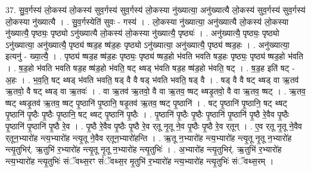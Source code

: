\documentclass[17pt]{extarticle}
\begin{document}
37. सु॒व॒र्गस्य॑ लो॒कस्य॑ लो॒कस्य॑ सुव॒र्गस्य॑ सुव॒र्गस्य॑ लो॒कस्या नु॑ख्यात्या॒ अनु॑ख्यात्यै लो॒कस्य॑ सुव॒र्गस्य॑ सुव॒र्गस्य॑ लो॒कस्या नु॑ख्यात्यै । . सु॒व॒र्गस्येति॑ सुवः - गस्य॑ । . लो॒कस्या नु॑ख्यात्या॒ अनु॑ख्यात्यै लो॒कस्य॑ लो॒कस्या नु॑ख्यात्यै॒ पृष्ठ्यः॒ पृष्ठ्यो ऽनु॑ख्यात्यै लो॒कस्य॑ लो॒कस्या नु॑ख्यात्यै॒ पृष्ठ्यः॑ । . अनु॑ख्यात्यै॒ पृष्ठ्यः॒ पृष्ठ्यो ऽनु॑ख्यात्या॒ अनु॑ख्यात्यै॒ पृष्ठ्य॑ ष्षड॒ह ष्ष॑ड॒हः पृष्ठ्यो ऽनु॑ख्यात्या॒ अनु॑ख्यात्यै॒ पृष्ठ्य॑ ष्षड॒हः । . अनु॑ख्यात्या॒ इत्यनु॑ - ख्या॒त्यै॒ । . पृष्ठ्य॑ ष्षड॒ह ष्ष॑ड॒हः पृष्ठ्यः॒ पृष्ठ्य॑ ष्षड॒हो भ॑वति भवति षड॒हः पृष्ठ्यः॒ पृष्ठ्य॑ ष्षड॒हो भ॑वति । . ष॒ड॒हो भ॑वति भवति षड॒ह ष्ष॑ड॒हो भ॑वति॒ षट् थ्षड् भ॑वति षड॒ह ष्ष॑ड॒हो भ॑वति॒ षट् । . ष॒ड॒ह इति॑ षट् - अ॒हः । . भ॒व॒ति॒ षट् थ्षड् भ॑वति भवति॒ षड् वै वै षड् भ॑वति भवति॒ षड् वै । . षड् वै वै षट् थ्षड् वा ऋ॒तव॑ ऋ॒तवो॒ वै षट् थ्षड् वा ऋ॒तवः॑ । . वा ऋ॒तव॑ ऋ॒तवो॒ वै वा ऋ॒तव॒ ष्षट् थ्षडृ॒तवो॒ वै वा ऋ॒तव॒ ष्षट् । . ऋ॒तव॒ ष्षट् थ्षडृ॒तव॑ ऋ॒तव॒ ष्षट् पृ॒ष्ठानि॑ पृ॒ष्ठानि॒ षडृ॒तव॑ ऋ॒तव॒ ष्षट् पृ॒ष्ठानि॑ । . षट् पृ॒ष्ठानि॑ पृ॒ष्ठानि॒ षट् थ्षट् पृ॒ष्ठानि॑ पृ॒ष्ठैः पृ॒ष्ठैः पृ॒ष्ठानि॒ षट् थ्षट् पृ॒ष्ठानि॑ पृ॒ष्ठैः । . पृ॒ष्ठानि॑ पृ॒ष्ठैः पृ॒ष्ठैः पृ॒ष्ठानि॑ पृ॒ष्ठानि॑ पृ॒ष्ठै रे॒वैव पृ॒ष्ठैः पृ॒ष्ठानि॑ पृ॒ष्ठानि॑ पृ॒ष्ठै रे॒व । . पृ॒ष्ठै रे॒वैव पृ॒ष्ठैः पृ॒ष्ठै रे॒व र्‌तू नृ॒तू ने॒व पृ॒ष्ठैः पृ॒ष्ठै रे॒व र्‌तून् । . ए॒व र्‌तू नृ॒तू ने॒वैव र्‌तून॒भ्यारो॑ह न्त्य॒भ्यारो॑ह न्त्यृ॒तू ने॒वैव र्‌तून॒भ्यारो॑हन्ति । . ऋ॒तू न॒भ्यारो॑ह न्त्य॒भ्यारो॑ह न्त्यृ॒तू नृ॒तू न॒भ्यारो॑ह न्त्यृ॒तुभिर्॑. ऋ॒तुभि॑ र॒भ्यारो॑ह न्त्यृ॒तू नृ॒तू न॒भ्यारो॑ह न्त्यृ॒तुभिः॑ । . अ॒भ्यारो॑ह न्त्यृ॒तुभिर्॑. ऋ॒तुभि॑ र॒भ्यारो॑ह न्त्य॒भ्यारो॑ह न्त्यृ॒तुभिः॑ संॅवथ्स॒रꣳ सं॑ॅवथ्स॒र मृ॒तुभि॑ र॒भ्यारो॑ह न्त्य॒भ्यारो॑ह न्त्यृ॒तुभिः॑ संॅवथ्स॒रम् । \newline
\end{document}
